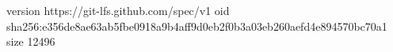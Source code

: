 version https://git-lfs.github.com/spec/v1
oid sha256:e356de8ae63ab5fbe0918a9b4aff9d0eb2f0b3a03eb260aefd4e894570bc70a1
size 12496
